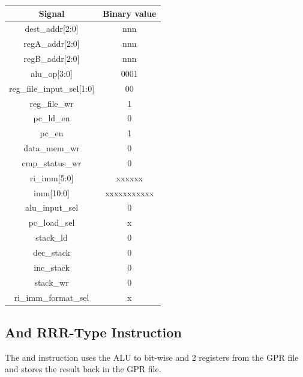 \documentclass{article}
\begin{document}
\begin{par}
	\begin{center}
		\begin{tabular}{|c|c|}
			\hline 
			\textbf{Signal} & \textbf{Binary value} \\ 
			\hline 
			dest\_addr[2:0] & nnn \\ 
			\hline 
			regA\_addr[2:0] & nnn \\ 
			\hline 
			regB\_addr[2:0] & nnn \\ 
			\hline 
			alu\_op[3:0] & 0001 \\ 
			\hline 
			reg\_file\_input\_sel[1:0] & 00 \\ 
			\hline 
			reg\_file\_wr & 1 \\ 
			\hline 
			pc\_ld\_en & 0 \\ 
			\hline 
			pc\_en & 1 \\ 
			\hline 
			data\_mem\_wr & 0 \\ 
			\hline 
			cmp\_status\_wr & 0 \\ 
			\hline 
			ri\_imm[5:0] & xxxxxx \\ 
			\hline 
			imm[10:0] & xxxxxxxxxxx \\ 
			\hline 
			alu\_input\_sel & 0 \\ 
			\hline 
			pc\_load\_sel & x \\ 
			\hline 
			stack\_ld & 0 \\ 
			\hline 
			dec\_stack & 0 \\ 
			\hline 
			inc\_stack & 0 \\ 
			\hline 
			stack\_wr & 0 \\ 
			\hline 
			ri\_imm\_format\_sel & x \\ 
			\hline 
		\end{tabular} 
	\end{center}

	\newpage
	\subsection{And RRR-Type Instruction}
	
	The and instruction uses the ALU to bit-wise and 2 registers from the GPR file and stores the result back in the GPR file. \\
	

\end{par}
\end{document}
